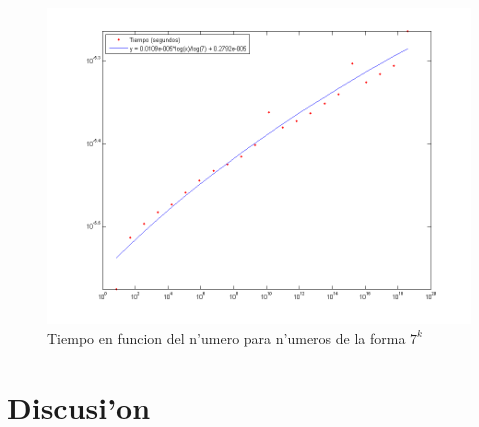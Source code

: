 \begin{figure}[H]
\centering
\includegraphics[scale=0.5]{../../codigo/ejercicio1/benchmark_de_tiempo/graficos/potencias_de_7/Potencias_de_7_tiempo.png}
\caption{Tiempo en funcion del n'umero para n'umeros de la forma $7^k$}
\end{figure}

\section{Discusi'on}


